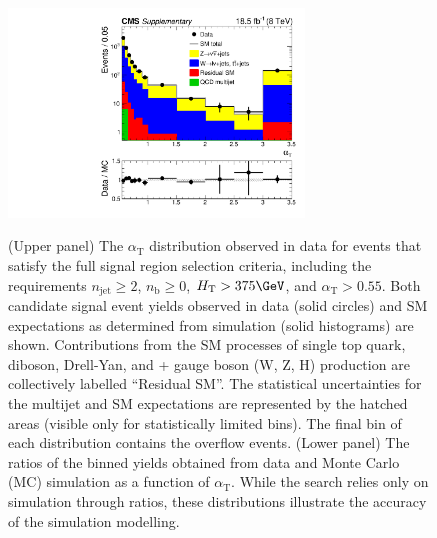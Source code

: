 \clearpage
\begin{figure}[h!]
  \begin{center}
    \includegraphics[width=0.7\textwidth]{RootFilesAndTarFiles/AlphaT} \\
    \caption{ (Upper panel) The $\alpha_\text{T}$ distribution
      observed in data for events that satisfy the full signal region
      selection criteria, including the requirements $n_\text{jet}
      \geq 2$, $n_\text{b} \geq 0$, $H_\text{T} > 375\GeV$, and
      $\alpha_\text{T} > 0.55$. Both candidate signal event yields
      observed in data (solid circles) and SM expectations as
      determined from simulation (solid histograms) are
      shown. Contributions from the SM processes of single top quark,
      diboson, Drell-Yan, and \ttbar + gauge boson (W, Z,
      H) production are collectively labelled ``Residual SM''.  The
      statistical uncertainties for the multijet and SM expectations
      are represented by the hatched areas (visible only for
      statistically limited bins). The final bin of each distribution
      contains the overflow events.  (Lower panel) The ratios of the
      binned yields obtained from data and Monte Carlo (MC) simulation
      as a function of $\alpha_\text{T}$. While the search relies only
      on simulation through ratios, these distributions illustrate the
      accuracy of the simulation modelling.  }
  \end{center}
\end{figure}

